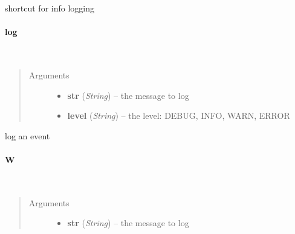 \documentclass[letterpaper,10pt,english]{sphinxmanual}
\begin{document}
shortcut for info logging


\paragraph{log}
\label{ambrosia_web.util.Log:log}

\begin{fulllineitems}
\label{ambrosia_web.util.Log:ambrosia_web.util.Log.log}~\begin{quote}\begin{description}
\item[{Arguments}] \leavevmode\begin{itemize}
\item {} 
\textbf{str} (\emph{String}) -- the message to log

\item {} 
\textbf{level} (\emph{String}) -- the level: DEBUG, INFO, WARN, ERROR

\end{itemize}

\end{description}\end{quote}

\end{fulllineitems}


log an event


\paragraph{W}
\label{ambrosia_web.util.Log:w}

\begin{fulllineitems}
\label{ambrosia_web.util.Log:ambrosia_web.util.Log.W}~\begin{quote}\begin{description}
\item[{Arguments}] \leavevmode\begin{itemize}
\item {} 
\textbf{str} (\emph{String}) -- the message to log

\end{itemize}

\end{description}\end{quote}

\end{fulllineitems}
\end{document}
